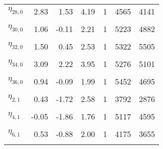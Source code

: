 \begin{longtable}[t]{lrrrrrr}
$\eta_{28, 0}$ & 2.83 & 1.53 & 4.19 & 1 & 4565 & 4141\\
\cellcolor{gray!6}{$\eta_{29, 0}$} & \cellcolor{gray!6}{1.66} & \cellcolor{gray!6}{1.01} & \cellcolor{gray!6}{2.31} & \cellcolor{gray!6}{1} & \cellcolor{gray!6}{5389} & \cellcolor{gray!6}{5000}\\
$\eta_{30, 0}$ & 1.06 & -0.11 & 2.21 & 1 & 5223 & 4882\\
\cellcolor{gray!6}{$\eta_{31, 0}$} & \cellcolor{gray!6}{2.36} & \cellcolor{gray!6}{1.20} & \cellcolor{gray!6}{3.54} & \cellcolor{gray!6}{1} & \cellcolor{gray!6}{4672} & \cellcolor{gray!6}{4623}\\
$\eta_{32, 0}$ & 1.50 & 0.45 & 2.53 & 1 & 5322 & 5505\\
\cellcolor{gray!6}{$\eta_{33, 0}$} & \cellcolor{gray!6}{3.91} & \cellcolor{gray!6}{2.62} & \cellcolor{gray!6}{5.17} & \cellcolor{gray!6}{1} & \cellcolor{gray!6}{5463} & \cellcolor{gray!6}{3971}\\
$\eta_{34, 0}$ & 3.09 & 2.22 & 3.95 & 1 & 5276 & 5101\\
\cellcolor{gray!6}{$\eta_{35, 0}$} & \cellcolor{gray!6}{1.51} & \cellcolor{gray!6}{0.38} & \cellcolor{gray!6}{2.58} & \cellcolor{gray!6}{1} & \cellcolor{gray!6}{5251} & \cellcolor{gray!6}{5798}\\
$\eta_{36, 0}$ & 0.94 & -0.09 & 1.99 & 1 & 5452 & 4695\\
\cellcolor{gray!6}{$\eta_{1, 1}$} & \cellcolor{gray!6}{0.42} & \cellcolor{gray!6}{-1.14} & \cellcolor{gray!6}{1.97} & \cellcolor{gray!6}{1} & \cellcolor{gray!6}{5577} & \cellcolor{gray!6}{5072}\\
$\eta_{2, 1}$ & 0.43 & -1.72 & 2.58 & 1 & 3792 & 2876\\
\cellcolor{gray!6}{$\eta_{3, 1}$} & \cellcolor{gray!6}{2.14} & \cellcolor{gray!6}{0.45} & \cellcolor{gray!6}{3.86} & \cellcolor{gray!6}{1} & \cellcolor{gray!6}{4344} & \cellcolor{gray!6}{3558}\\
$\eta_{4, 1}$ & -0.05 & -1.86 & 1.76 & 1 & 5117 & 4595\\
\cellcolor{gray!6}{$\eta_{5, 1}$} & \cellcolor{gray!6}{-0.73} & \cellcolor{gray!6}{-2.73} & \cellcolor{gray!6}{1.16} & \cellcolor{gray!6}{1} & \cellcolor{gray!6}{5122} & \cellcolor{gray!6}{4199}\\
$\eta_{6, 1}$ & 0.53 & -0.88 & 2.00 & 1 & 4175 & 3655\\
\cellcolor{gray!6}{$\eta_{7, 1}$} & \cellcolor{gray!6}{2.52} & \cellcolor{gray!6}{0.05} & \cellcolor{gray!6}{5.34} & \cellcolor{gray!6}{1} & \cellcolor{gray!6}{4624} & \cellcolor{gray!6}{2815}\\

\end{longtable}
